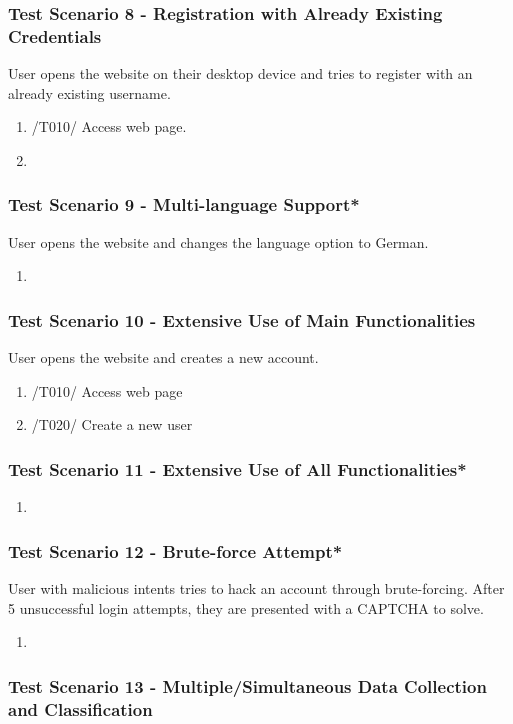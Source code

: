 \subsubsection{Test Scenario 8 - Registration with Already Existing Credentials}
User opens the website on their desktop device and tries to register with an already existing username.
\begin{enumerate}
    \item /T010/ Access web page.
    \item 
\end{enumerate}
\subsubsection{Test Scenario 9 - Multi-language Support*}
User opens the website and changes the language option to German. 
\begin{enumerate}
    \item 
\end{enumerate}
\subsubsection{Test Scenario 10 - Extensive Use of Main Functionalities}
User opens the website and creates a new account. 
\begin{enumerate}
    \item /T010/ Access web page
    \item /T020/ Create a new user
\end{enumerate}
\subsubsection{Test Scenario 11 - Extensive Use of All Functionalities*}

\begin{enumerate}
    \item 
\end{enumerate}
\subsubsection{Test Scenario 12 - Brute-force Attempt*}
User with malicious intents tries to hack an account through brute-forcing. After 5 unsuccessful login attempts, they are presented with a CAPTCHA to solve.
\begin{enumerate}
    \item 
\end{enumerate}
\subsubsection{Test Scenario 13 - Multiple/Simultaneous Data Collection and Classification}
